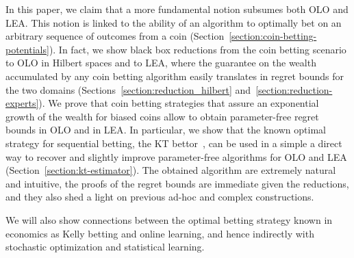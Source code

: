 In this paper, we claim that a more fundamental notion subsumes both \ac{OLO}
and \ac{LEA}. This notion is linked to the ability of an algorithm to
optimally bet on an arbitrary sequence of outcomes from a coin (Section~\ref{section:coin-betting-potentials}). In fact, we show black
box reductions from the coin betting scenario to \ac{OLO} in Hilbert spaces and
to \ac{LEA}, where the guarantee on the wealth accumulated by any coin betting
algorithm easily translates in regret bounds for the two domains (Sections~\ref{section:reduction_hilbert} and~\ref{section:reduction-experts}). We prove that
coin betting strategies that assure an exponential growth of the wealth for
biased coins allow to obtain parameter-free regret bounds in \ac{OLO} and in
\ac{LEA}. In particular, we show that the known optimal strategy for
sequential betting, the \ac{KT} bettor~\citep{KrichevskyT81}, can be used in a
simple a direct way to recover and slightly improve parameter-free algorithms
for \ac{OLO} and \ac{LEA} (Section~\ref{section:kt-estimator}). The obtained algorithm are extremely natural and
intuitive, the proofs of the regret bounds are immediate given the reductions,
and they also shed a light on previous ad-hoc and complex constructions.

We will also show connections between the optimal betting strategy known in
economics as Kelly betting \citep{Kelly56} and online learning, and hence
indirectly with stochastic optimization and statistical learning.
